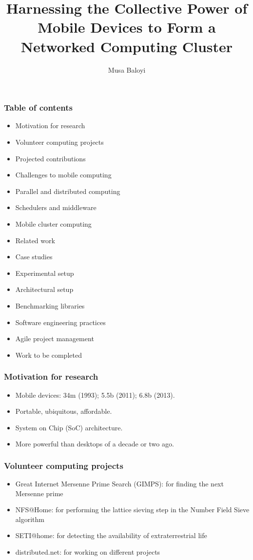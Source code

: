 \documentclass[11pt]{beamer}
\begin{document}
	\author{Musa Baloyi}
	\title{Harnessing the Collective Power of Mobile Devices to Form a Networked Computing Cluster}
	\begin{frame}[plain]
	\maketitle
\end{frame}

\begin{frame}
\frametitle{Table of contents}
\begin{itemize}
	\item Motivation for research
	\item Volunteer computing projects
	\item Projected contributions
	\item Challenges to mobile computing
	\item Parallel and distributed computing
	\item Schedulers and middleware
	\item Mobile cluster computing
	\item Related work
	\item Case studies
	\item Experimental setup
	\item Architectural setup
	\item Benchmarking libraries	
	\item Software engineering practices
	\item Agile project management
	\item Work to be completed
\end{itemize}
\end{frame}


\begin{frame}
\frametitle{Motivation for research}
\begin{itemize}
	\item Mobile devices: 34m (1993); 5.5b (2011); 6.8b (2013).
	\item Portable, ubiquitous, affordable.
	\item System on Chip (SoC) architecture.
	\item More powerful than desktops of a decade or two ago.
\end{itemize}
\end{frame}

\begin{frame}
\frametitle{Volunteer computing projects}
\begin{itemize}
	\item Great Internet Mersenne Prime Search (GIMPS): for finding the next Mersenne prime
	\item NFS@Home: for performing the lattice sieving step in the Number Field Sieve algorithm
	\item SETI@home: for detecting the availability of extraterrestrial life
	\item distributed.net: for working on different projects
\end{itemize}
\end{frame}
\end{document}
